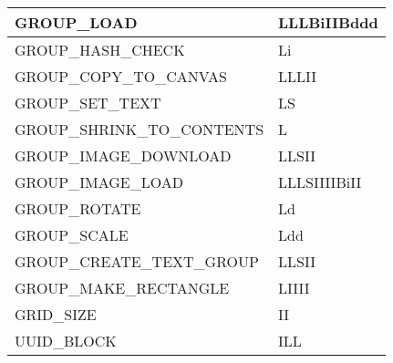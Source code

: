 \begin{table}[h]
\begin{tabular}{ | l | l | }
  \hline
  GROUP\_LOAD & LLLBiIIBddd \\
  \hline
  GROUP\_HASH\_CHECK & Li \\
  \hline
  GROUP\_COPY\_TO\_CANVAS & LLLII \\
  \hline
  GROUP\_SET\_TEXT & LS \\
  \hline
  GROUP\_SHRINK\_TO\_CONTENTS & L \\
  \hline
  GROUP\_IMAGE\_DOWNLOAD & LLSII \\
  \hline
  GROUP\_IMAGE\_LOAD & LLLSIIIIBiII \\
  \hline
  GROUP\_ROTATE & Ld \\
  \hline
  GROUP\_SCALE & Ldd \\
  \hline
  GROUP\_CREATE\_TEXT\_GROUP & LLSII \\
  \hline
  GROUP\_MAKE\_RECTANGLE & LIIII \\
  \hline
  GRID\_SIZE & II \\
  \hline
  UUID\_BLOCK & ILL \\
  \hline
  \end{tabular}
\end{table}

